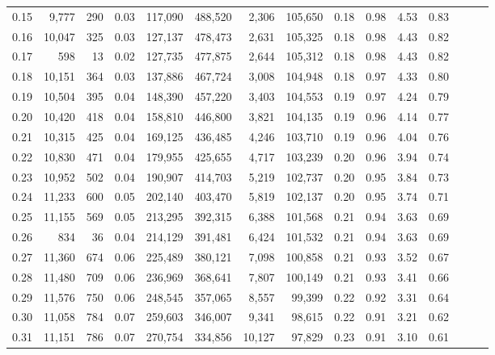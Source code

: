 \begin{tabular}{rrrrrrrrrrrrrrr}
0.15 &   9,777 &    290 &  0.03 &  117,090 &  488,520 &    2,306 &  105,650 &  0.18 &  0.98 &  4.53 &      0.83 \\
0.16 &  10,047 &    325 &  0.03 &  127,137 &  478,473 &    2,631 &  105,325 &  0.18 &  0.98 &  4.43 &      0.82 \\
0.17 &     598 &     13 &  0.02 &  127,735 &  477,875 &    2,644 &  105,312 &  0.18 &  0.98 &  4.43 &      0.82 \\
0.18 &  10,151 &    364 &  0.03 &  137,886 &  467,724 &    3,008 &  104,948 &  0.18 &  0.97 &  4.33 &      0.80 \\
0.19 &  10,504 &    395 &  0.04 &  148,390 &  457,220 &    3,403 &  104,553 &  0.19 &  0.97 &  4.24 &      0.79 \\
0.20 &  10,420 &    418 &  0.04 &  158,810 &  446,800 &    3,821 &  104,135 &  0.19 &  0.96 &  4.14 &      0.77 \\
0.21 &  10,315 &    425 &  0.04 &  169,125 &  436,485 &    4,246 &  103,710 &  0.19 &  0.96 &  4.04 &      0.76 \\
0.22 &  10,830 &    471 &  0.04 &  179,955 &  425,655 &    4,717 &  103,239 &  0.20 &  0.96 &  3.94 &      0.74 \\
0.23 &  10,952 &    502 &  0.04 &  190,907 &  414,703 &    5,219 &  102,737 &  0.20 &  0.95 &  3.84 &      0.73 \\
0.24 &  11,233 &    600 &  0.05 &  202,140 &  403,470 &    5,819 &  102,137 &  0.20 &  0.95 &  3.74 &      0.71 \\
0.25 &  11,155 &    569 &  0.05 &  213,295 &  392,315 &    6,388 &  101,568 &  0.21 &  0.94 &  3.63 &      0.69 \\
0.26 &     834 &     36 &  0.04 &  214,129 &  391,481 &    6,424 &  101,532 &  0.21 &  0.94 &  3.63 &      0.69 \\
0.27 &  11,360 &    674 &  0.06 &  225,489 &  380,121 &    7,098 &  100,858 &  0.21 &  0.93 &  3.52 &      0.67 \\
0.28 &  11,480 &    709 &  0.06 &  236,969 &  368,641 &    7,807 &  100,149 &  0.21 &  0.93 &  3.41 &      0.66 \\
0.29 &  11,576 &    750 &  0.06 &  248,545 &  357,065 &    8,557 &   99,399 &  0.22 &  0.92 &  3.31 &      0.64 \\
0.30 &  11,058 &    784 &  0.07 &  259,603 &  346,007 &    9,341 &   98,615 &  0.22 &  0.91 &  3.21 &      0.62 \\
0.31 &  11,151 &    786 &  0.07 &  270,754 &  334,856 &   10,127 &   97,829 &  0.23 &  0.91 &  3.10 &      0.61 \\

\end{tabular}
